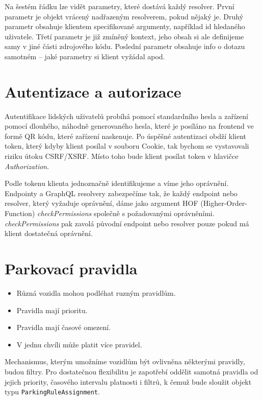 Na šestém řádku lze vidět parametry, které dostává každý resolver. První parametr je objekt vrácený nadřazeným resolverem,
pokud nějaký je. Druhý parametr obsahuje klientem specifikované argumenty, například id hledaného uživatele.
Třetí parametr je již zmíněný kontext, jeho
obsah si ale definijeme samy v jiné části zdrojového kódu. Poslední parametr obsahuje info o dotazu samotném --
jaké parametry si klient vyžádal apod.

\section{Autentizace a autorizace} \label{auther_authen}

Autentifikace lidských uživatelů probíhá pomocí standardního hesla a zařízení pomocí dlouhého, náhodně generovaného hesla,
které je posíláno na frontend ve formě QR kódu, které zařízení naskenuje.
Po úspěšné autentizaci obdží klient token, který kdyby klient posílal v souboru Cookie,
tak bychom se vystavovali riziku útoku CSRF/XSRF.
Místo toho bude klient posílat token v hlavičce \textit{Authorization}.

Podle tokenu klienta jednoznačně identifikujeme a víme jeho oprávnění. Endpointy a GraphQL resolvery zabezpečíme tak,
že každý endpoint nebo resolver, který vyžaduje oprávnění, dáme jako argument HOF (Higher-Order-Function)
\textit{checkPermissions} společně s požadovanými oprávněními. \textit{checkPermissions} pak zavolá původní endpoint
nebo resolver pouze pokud má klient dostatečná oprávnění.

\section{Parkovací pravidla} \label{analysis_parking_schema}

\begin{itemize}
  \setlength\itemsep{.05em}
  \item Různá vozidla mohou podléhat ruzným pravidlům.
  \item Pravidla mají prioritu.
  \item Pravidla mají časové omezení.
  \item V jednu chvíli může platit více pravidel.
\end{itemize}

Mechanismus, kterým umožníme vozidlům být ovlivněna některými pravidly,
budou filtry.
Pro dostatečnou flexibilitu je zapotřebí oddělit samotná pravidla od jejich
priority, časového intervalu platnosti i filtrů,
k čemuž bude sloužit objekt typu \texttt{ParkingRuleAssignment}.

